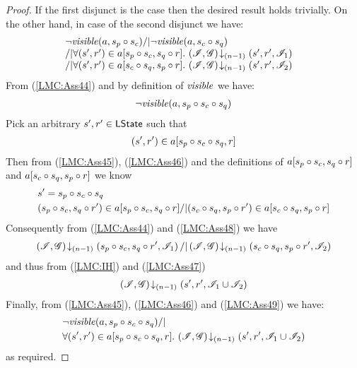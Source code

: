 \begin{lemma}
\begin{proof}
If the first disjunct is the case then the desired result holds trivially. On the other hand, in case of the second disjunct we have:
%
\begin{align}
	& 
	\begin{array}{@{} l @{}}
		\neg\m{visible}(a,s_p \composeL s_c) /| \neg\m{visible}(a, s_c \composeL s_q) \\
		/| \for{(s', r') \in a[s_p \composeL s_c, s_q \composeL r]} \extendsAMUpto{\lmod, \gmod}{(n-1)}{s'}{r'}{\lmod_{1}} \\
  	/| \for{(s', r') \in a[s_c \composeL s_q, s_p \composeL r]} \extendsAMUpto{\lmod, \gmod}{(n-1)}{s'}{r'}{\lmod_{2}} 
	\end{array}
	\label{LMC:Ass44}
\end{align}
%
From (\ref{LMC:Ass44}) and by definition of $\mathit{visible}$ we have:
%
\begin{align}
	\neg\mathit{visible}(a, s_p \circ s_c \circ s_q)
	\label{LMC:Ass45}
\end{align}
%
Pick an arbitrary $s', r' \in \textsf{LState}$ such that
%
\begin{align}
	(s', r') \in a[s_p \circ s_c \circ s_q, r]
	\label{LMC:Ass46}
\end{align}
Then from (\ref{LMC:Ass45}), (\ref{LMC:Ass46}) and the definitions of $a[s_p \circ s_c, s_q \circ r]$ and $a[s_c \circ s_q, s_p \circ r]$ we know 
%
\begin{align}
	& s' = s_p \circ s_c \circ s_q \label{LMC:Ass47}\\
	&(s_p \circ s_c, s_q \circ r') \in a[s_p \circ s_c, s_q \circ r] /| 
	(s_c \circ s_q, s_p \circ r') \in a[s_c \circ s_q, s_p \circ r]
	\label{LMC:Ass48}
\end{align}
%
Consequently from (\ref{LMC:Ass44}) and (\ref{LMC:Ass48}) we have
%
\begin{align*}
	\left(\mathscr{I}, \mathscr{G}\right) \!\downarrow_{(n-1)} \left(s_p \circ s_c, s_q \circ r', \mathscr{I}_1\right) /| \left(\mathscr{I}, \mathscr{G}\right) \!\downarrow_{(n-1)} \left(s_c \circ s_q, s_p \circ r', \mathscr{I}_2\right)
\end{align*}
% 
and thus from (\ref{LMC:IH}) and (\ref{LMC:Ass47})
%
\begin{align}
	\left(\mathscr{I}, \mathscr{G}\right) \!\downarrow_{(n-1)} \left(s', r', \mathscr{I}_1 \cup \mathscr{I}_2\right)
	\label{LMC:Ass49}
\end{align}
Finally, from (\ref{LMC:Ass45}), (\ref{LMC:Ass46}) and (\ref{LMC:Ass49}) we have:
%
\begin{align*}
	& \neg\mathit{visible}(a, s_p \circ s_c \circ s_q)  /| \\
	& \forall (s', r') \in a[s_p \circ s_c \circ s_q, r].\, \left(\mathscr{I}, \mathscr{G}\right) \!\downarrow_{(n-1)} \left(s', r', \mathscr{I}_1 \cup \mathscr{I}_2\right)
\end{align*}
%
as required.
%
%
%
%
%

\end{proof}
\end{lemma}
%
%